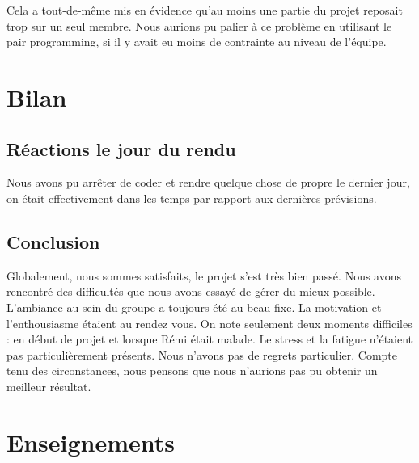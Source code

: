 \documentclass[a4paper, 12pt]{article}
\begin{document}
Cela a tout-de-même mis en évidence qu'au moins une partie du projet
reposait trop sur un seul membre. Nous aurions pu palier à ce
problème en utilisant le pair programming, si il y avait eu moins
de contrainte au niveau de l'équipe.

\section{Bilan}

\subsection{Réactions le jour du rendu}

Nous avons pu arrêter de coder et rendre quelque chose de propre le
dernier jour, on était effectivement dans les temps par rapport aux
dernières prévisions.

\subsection{Conclusion}

Globalement, nous sommes satisfaits, le projet s'est très bien passé.
Nous avons rencontré des difficultés que nous avons essayé de gérer
du mieux possible. L'ambiance au sein du groupe a toujours été
au beau fixe. La motivation et l'enthousiasme étaient au rendez
vous. On note seulement deux moments difficiles : en début de projet et
lorsque Rémi était malade. Le stress et la fatigue n'étaient pas
particulièrement présents. Nous n'avons pas de regrets particulier.
Compte tenu des circonstances, nous pensons que nous n'aurions pas pu
obtenir un meilleur résultat.


\section{Enseignements}
\end{document}
